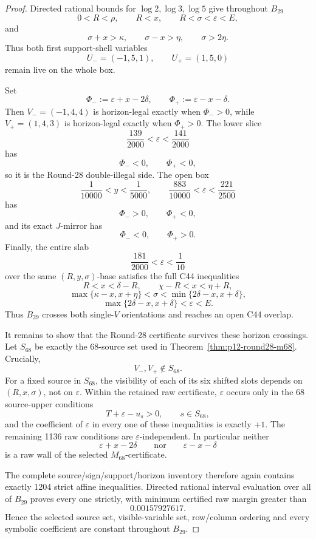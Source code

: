 \begin{proof}
Directed rational bounds for \(\log2,\log3,\log5\) give throughout
\(B_{29}\)
\[
0<R<\rho,\qquad R<x,\qquad R<\sigma<\varepsilon<E,
\]
and
\[
\sigma+x>\kappa,\qquad
\sigma-x>\eta,
\qquad
\sigma>2\eta.
\]
Thus both first support-shell variables
\[
U_-=(-1,5,1),\qquad U_+=(1,5,0)
\]
remain live on the whole box.

Set
\[
\Phi_-:=\varepsilon+x-2\delta,
\qquad
\Phi_+:=\varepsilon-x-\delta.
\]
Then \(V_-=(-1,4,4)\) is horizon-legal exactly when \(\Phi_->0\), while
\(V_+=(1,4,3)\) is horizon-legal exactly when \(\Phi_+>0\).
The lower slice
\[
\frac{139}{2000}<\varepsilon<\frac{141}{2000}
\]
has
\[
\Phi_-<0,\qquad \Phi_+<0,
\]
so it is the Round-28 double-illegal side.  The open box
\[
\frac1{10000}<y<\frac1{5000},
\qquad
\frac{883}{10000}<\varepsilon<\frac{221}{2500}
\]
has
\[
\Phi_->0,\qquad \Phi_+<0,
\]
and its exact \(J\)-mirror has
\[
\Phi_-<0,\qquad \Phi_+>0.
\]
Finally, the entire slab
\[
\frac{181}{2000}<\varepsilon<\frac1{10}
\]
over the same \((R,y,\sigma)\)-base satisfies the full C44 inequalities
\[
R<x<\delta-R,
\qquad
\chi-R<x<\eta+R,
\]
\[
\max\{\kappa-x,x+\eta\}<\sigma
<\min\{2\delta-x,x+\delta\},
\]
\[
\max\{2\delta-x,x+\delta\}<\varepsilon<E.
\]
Thus \(B_{29}\) crosses both single-\(V\) orientations and reaches an open
C44 overlap.

It remains to show that the Round-28 certificate survives these horizon
crossings.  Let \(S_{68}\) be exactly the 68-source set used in
Theorem~\ref{thm:p12-round28-m68}.  Crucially,
\[
V_-,V_+\notin S_{68}.
\]
For a fixed source in \(S_{68}\), the visibility of each of its six shifted
slots depends on \((R,x,\sigma)\), not on \(\varepsilon\).  Within the
retained raw certificate, \(\varepsilon\) occurs only in the 68 source-upper
conditions
\[
T+\varepsilon-u_s>0,
\qquad s\in S_{68},
\]
and the coefficient of \(\varepsilon\) in every one of these inequalities
is exactly \(+1\).  The remaining 1136 raw conditions are
\(\varepsilon\)-independent.  In particular neither
\[
\varepsilon+x-2\delta
\qquad\text{nor}\qquad
\varepsilon-x-\delta
\]
is a raw wall of the selected \(M_{68}\)-certificate.

The complete source/sign/support/horizon inventory therefore again contains
exactly 1204 strict affine inequalities.  Directed rational interval
evaluation over all of \(B_{29}\) proves every one strictly, with minimum
certified raw margin greater than
\[
0.00157927617.
\]
Hence the selected source set, visible-variable set, row/column ordering and
every symbolic coefficient are constant throughout \(B_{29}\).


\end{proof}
